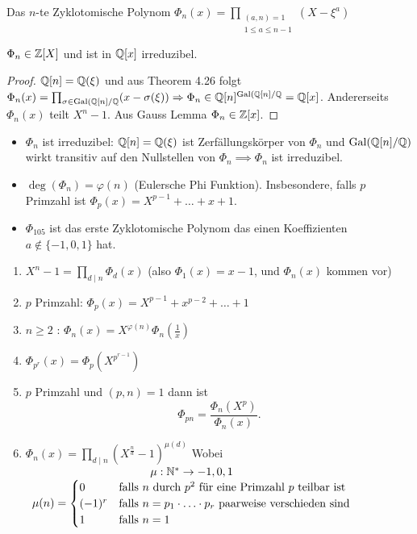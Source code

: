 \begin{definition}
	Das $n $-te Zyklotomische Polynom $\Phi_{n}(x) = \prod_{\substack{(a,n) = 1\\ 1 \leq a \leq n-1}} (X-\xi^{a})$
\end{definition}

\begin{corollary}
	$\Phi_{n} \in \mathbb{Z}[X]$ und ist in $\mathbb{Q}[x]$ irreduzibel.
\end{corollary}

\begin{proof}
	$\mathbb{Q}[n] = \mathbb{Q}(\xi)$ und aus Theorem 4.26 folgt $\Phi_{n}(x) = \prod_{\sigma \in \operatorname{Gal}(\mathbb{Q}[n] / \mathbb{Q}} (x-\sigma(\xi)) \Rightarrow \Phi_{n} \in \mathbb{Q}[n]^{\operatorname{Gal}(\mathbb{Q}[n] / \mathbb{Q}} = \mathbb{Q}[x]$.
	Andererseits $\Phi_{n}(x)$ teilt $X^{n}-1$.
	Aus Gauss Lemma $\Phi_{n} \in \mathbb{Z}[x]$.
\end{proof}

\begin{itemize}
	\item $\Phi_{n}$ ist irreduzibel: $\mathbb{Q}[n] = \mathbb{Q}(\xi)$ ist Zerfällungskörper von $\Phi_{n}$ und $\operatorname{Gal}(\mathbb{Q}[n] / \mathbb{Q})$ wirkt transitiv auf den Nullstellen von $\Phi_{n} \implies \Phi_{n}$ 
ist irreduzibel.
	\item $\deg(\Phi_{n}) = \varphi(n)$ (Eulersche Phi Funktion). Insbesondere, falls $p$ Primzahl ist $\Phi_{p}(x) = X^{p-1} + \ldots + x + 1$.
	\item $\Phi_{105}$ ist das erste Zyklotomische Polynom das einen Koeffizienten $a \not\in \{-1,0,1\}$ hat.
\end{itemize}

\begin{proposition}
	\begin{enumerate}
		\item $X^{n}-1 = \prod_{d \mid n} \Phi_{d}(x)$ (also $\Phi_{1}(x) = x-1$, und $\Phi_{n}(x)$ kommen vor)
		\item $p$ Primzahl: $\Phi_{p}(x) = X^{p-1} + x^{p-2} + \ldots + 1$
		\item $n \geq 2$ : $\Phi_{n}(x) = X^{\varphi(n)} \Phi_{n}(\frac{1}{x})$
		\item $\Phi_{p^{r}}(x) = \Phi_{p}(X^{p^{r-1}})$ 
		\item $p$ Primzahl und $(p,n) = 1$ dann ist
			\[
				\Phi_{pn} = \frac{\Phi_{n}(X^{p})}{\Phi_{n}(x)}
			.\]
		\item $\Phi_{n}(x) = \prod_{d \mid n} (X^{\frac{n}{d}}-1)^{\mu(d)}$ Wobei $\begin{array}{c} \mu: \mathbb{N}^{*} \to {-1,0,1}\\ \mu(n) = \begin{cases}
					0 &\text{falls $n$ durch $p^2$ für eine Primzahl $p$ teilbar ist}\\
				(-1)^{r} &\text{falls } n = p_1 \cdot \ldots\cdot p_{r} \text{ paarweise verschieden sind}\\
			1 &\text{falls } n = 1
	\end{cases}\\ \end{array}$
	\end{enumerate}
\end{proposition}


